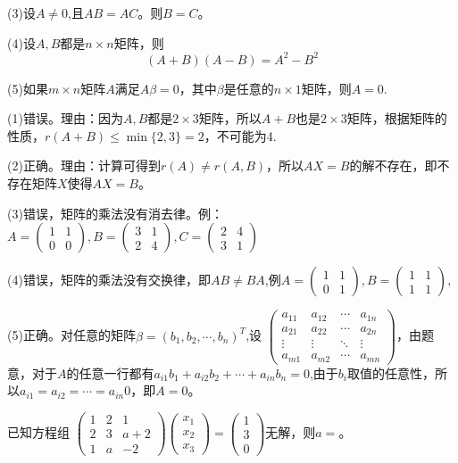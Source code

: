 \documentclass[a4paper]{report}
\begin{document}
(3)设$A\neq 0$,且$AB=AC$。则$B=C$。

(4)设$A,B$都是$n\times n$矩阵，则
\begin{equation*}
  (A+B)(A-B)=A^2-B^2
\end{equation*}

(5)如果$m\times n$矩阵$A$满足$A\beta=0$，其中$\beta$是任意的$n\times 1$矩阵，则$A=0$.

\begin{jie}
(1)错误。理由：因为$A,B$都是$2\times3$矩阵，所以$A+B$也是$2\times3$矩阵，根据矩阵的性质，$r(A+B)\leq \min\{2,3\}=2$，不可能为4.

(2)正确。理由：计算可得到$r(A)\neq r(A,B)$，所以$AX=B$的解不存在，即不存在矩阵$X$使得$AX=B$。

(3)错误，矩阵的乘法没有消去律。例：$A=
\begin{pmatrix}
1 &1\\ 0&0
\end{pmatrix}
,B=
\begin{pmatrix}
3 &1\\ 2&4
\end{pmatrix},C=
\begin{pmatrix}
2&4\\ 3 &1
\end{pmatrix}
$

(4)错误，矩阵的乘法没有交换律，即$AB\neq BA$,例$A=\begin{pmatrix}
1 &1\\ 0&1
\end{pmatrix}
,B=\begin{pmatrix}
1 &1\\ 1&1
\end{pmatrix}
,$

(5)正确。对任意的矩阵$\beta=(b_1,b_2,\cdots,b_{n})^{T}$,设
$
\begin{pmatrix}
a_{11}&a_{12}&\cdots&a_{1n}\\
a_{21}&a_{22}&\cdots&a_{2n}\\
\vdots&\vdots&\ddots&\vdots\\
a_{m1}&a_{m2}&\cdots&a_{mn}
\end{pmatrix}
$，由题意，对于$A$的任意一行都有$a_{i1}b_1+a_{i2}b_2+\cdots+a_{in}b_n=0$,由于$b_i$取值的任意性，所以$a_{i1} = a_{i2}=\cdots=a_{in}0$，即$A=0$。
\end{jie}
\EX

\EX 已知方程组
$
\begin{pmatrix}
1&2&1\\
2&3&a+2\\
1&a&-2
\end{pmatrix}
\begin{pmatrix}
x_1\\ x_2\\ x_3
\end{pmatrix}=
\begin{pmatrix}
1\\ 3\\ 0
\end{pmatrix}
$无解，则$a=$\underline{\hphantom{~~~~~~~~~}}。
\end{document}
